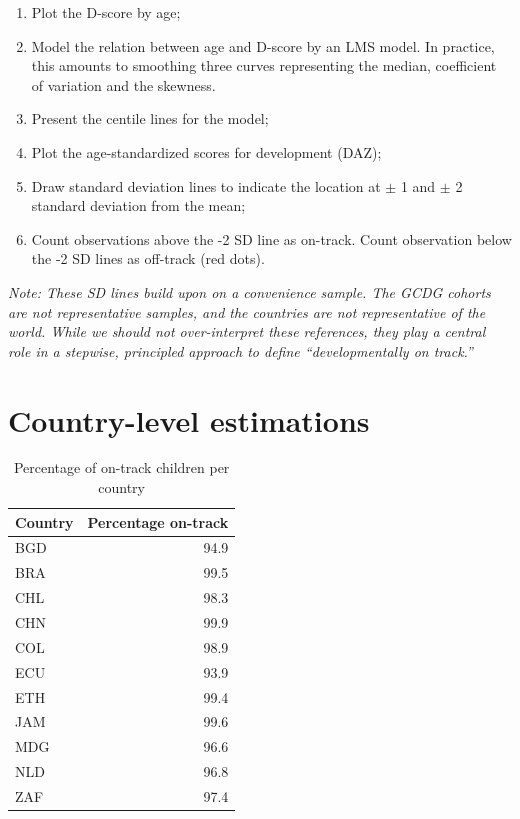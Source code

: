 \documentclass[
]{book}
\providecommand{\tightlist}{%
  \setlength{\itemsep}{0pt}\setlength{\parskip}{0pt}}
\begin{document}
\begin{enumerate}
\def\labelenumi{\arabic{enumi}.}
\tightlist
\item
  Plot the D-score by age;
\item
  Model the relation between age and D-score by an LMS model. In practice, this amounts to smoothing three curves representing the median, coefficient of variation and the skewness.
\item
  Present the centile lines for the model;
\item
  Plot the age-standardized scores for development (DAZ);
\item
  Draw standard deviation lines to indicate the location at \(\pm\) 1 and \(\pm\) 2 standard deviation from the mean;
\item
  Count observations above the -2 SD line as on-track. Count observation below the -2 SD lines as off-track (red dots).
\end{enumerate}

\emph{Note: These SD lines build upon on a convenience sample. The GCDG cohorts are not representative samples, and the countries are not representative of the world. While we should not over-interpret these references, they play a central role in a stepwise, principled approach to define ``developmentally on track.''}

\hypertarget{sec:countrytrack}{%
\section{Country-level estimations}\label{sec:countrytrack}}

\begin{table}

\caption{\label{tab:ontrack}Percentage of on-track children per country}
\centering
\begin{tabular}[t]{l|r}
\hline
Country & Percentage on-track\\
\hline
BGD & 94.9\\
\hline
BRA & 99.5\\
\hline
CHL & 98.3\\
\hline
CHN & 99.9\\
\hline
COL & 98.9\\
\hline
ECU & 93.9\\
\hline
ETH & 99.4\\
\hline
JAM & 99.6\\
\hline
MDG & 96.6\\
\hline
NLD & 96.8\\
\hline
ZAF & 97.4\\
\hline
\end{tabular}
\end{table}
\end{document}
